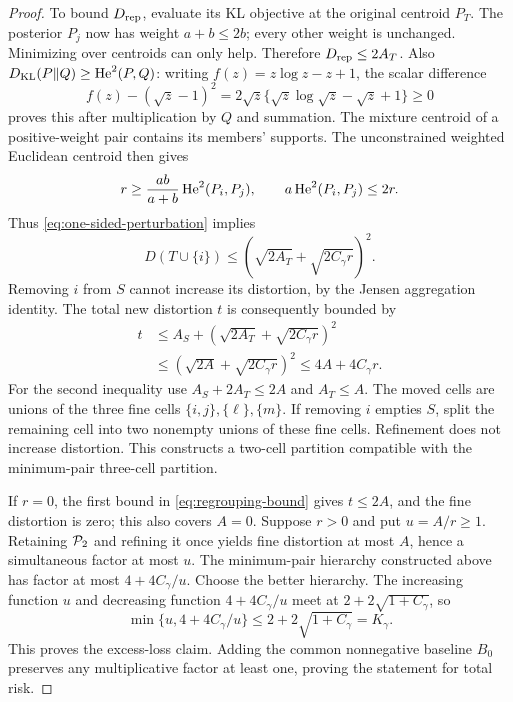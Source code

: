 \begin{proof}
To bound $D_{\rm rep}$, evaluate its KL objective at the original centroid
$P_T$. The posterior $P_j$ now has weight $a+b\le2b$; every other
weight is unchanged. Minimizing over centroids can only help. Therefore
$D_{\rm rep}\le2A_T$.
Also $D_{\mathrm{KL}}(P\Vert Q)\ge\operatorname{He}^2(P,Q)$: writing
$f(z)=z\log z-z+1$, the scalar difference
\[
 f(z)-(\sqrt z-1)^2
 =2\sqrt z\{\sqrt z\log\sqrt z-\sqrt z+1\}\ge0
\]
proves this after multiplication by $Q$ and summation. The mixture
centroid of a positive-weight pair contains its members' supports.
The unconstrained weighted Euclidean centroid then gives
\[
 r\ge\frac{ab}{a+b}\operatorname{He}^2(P_i,P_j),\qquad
 a\operatorname{He}^2(P_i,P_j)\le2r.
\]
Thus \eqref{eq:one-sided-perturbation} implies
\[
 D(T\cup\{i\})\le
    \left(\sqrt{2A_T}+\sqrt{2C_\gamma r}\right)^2.
\]
Removing $i$ from $S$ cannot increase its distortion, by the Jensen
aggregation identity. The total new distortion $t$ is consequently bounded by
\begin{align}
 t&\le A_S+
        \left(\sqrt{2A_T}+\sqrt{2C_\gamma r}\right)^2\nonumber\\
  &\le\left(\sqrt{2A}+\sqrt{2C_\gamma r}\right)^2
   \le4A+4C_\gamma r.
 \label{eq:regrouping-bound}
\end{align}
For the second inequality use $A_S+2A_T\le2A$ and $A_T\le A$.
The moved cells are unions of the three fine cells
$\{i,j\},\{\ell\},\{m\}$. If removing $i$ empties $S$, split the
remaining cell into two nonempty unions of these fine cells. Refinement
does not increase distortion. This constructs a two-cell partition
compatible with the minimum-pair three-cell partition.

If $r=0$, the first bound in \eqref{eq:regrouping-bound} gives
$t\le2A$, and the fine distortion is zero; this also covers $A=0$.
Suppose $r>0$ and put $u=A/r\ge1$. Retaining $\mathcal P_2$ and refining
it once yields fine distortion at most $A$, hence a simultaneous factor
at most $u$. The minimum-pair hierarchy constructed above has factor at
most $4+4C_\gamma/u$. Choose the better hierarchy. The increasing function
$u$ and decreasing function $4+4C_\gamma/u$ meet at
$2+2\sqrt{1+C_\gamma}$, so
\[
 \min\{u,4+4C_\gamma/u\}\le2+2\sqrt{1+C_\gamma}=K_\gamma.
\]
This proves the excess-loss claim. Adding the common nonnegative baseline
$B_0$ preserves any multiplicative factor at least one, proving the
statement for total risk.
\end{proof}

